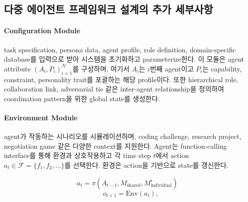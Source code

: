 \paragraph{}










\subsection{다중 에이전트 프레임워크 설계의 추가 세부사항}
\label{framework}

\paragraph{Configuration Module}
task specification, persona data, agent profile, role definition, domain-specific database를 입력으로 받아 시스템을 초기화하고 parameterize한다. 이 모듈은 agent attribute ${(A_i, P_i)}_{i=1}^{N}$를 구성하며, 여기서 $A_i$는 $i$번째 agent이고 $P_i$는 capability, constraint, personality trait를 포괄하는 해당 profile이다. 또한 hierarchical role, collaboration link, adversarial tie 같은 inter-agent relationship을 정의하여 coordination pattern을 위한 global state를 생성한다.

\paragraph{Environment Module}
agent가 작동하는 시나리오를 시뮬레이션하며, coding challenge, research project, negotiation game 같은 다양한 context를 지원한다. Agent는 function-calling interface를 통해 환경과 상호작용하고 각 time step $t$에서 action $a_t \in \mathcal{F} = \{f_1, f_2, \dots\}$를 선택한다. 환경은 action을 기반으로 state를 갱신한다.

\[
a_t = \pi(A_{t-1}, M_{\text{shared}}, M_{\text{individual}}^i)
\]
\[
\quad o_{t+1} = \text{Env}(a_t),
\]

